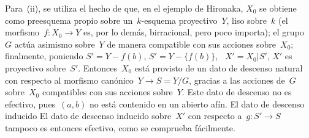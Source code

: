 \begin{remarques}
Para~(ii), se utiliza el hecho de que, en el ejemplo de Hironaka, $X_{0}$ se
obtiene como preesquema propio sobre un~$k$-esquema proyectivo~$Y$, liso
sobre~$k$ (el morfismo~$f\colon X_{0}\to Y$ es, por lo demás, birracional,
pero poco importa); el grupo~$G$ actúa asimismo sobre~$Y$ de manera
compatible con sus acciones sobre~$X_{0}$; finalmente, poniendo
{$S'=Y-f(b)$,}
{$S'=Y-\{f(b)\}$,}
~$X'=X_{0}|S'$, $X'$ es proyectivo sobre~$S'$. Entonces~$X_{0}$ está
provisto de un dato de descenso natural con respecto al morfismo
canónico~$Y\to S=Y/G$, gracias a las acciones de~$G$ sobre~$X_{0}$
compatibles con sus acciones sobre~$Y$. Este dato de descenso no es efectivo,
pues~$(a,b)$ no está contenido en un abierto afín.
{El dato de descenso inducido}
{El dato de descenso inducido}
sobre~$X'$ con respecto a~$g\colon S'\to S$ tampoco es entonces efectivo,
como se comprueba fácilmente.
\end{remarques}

